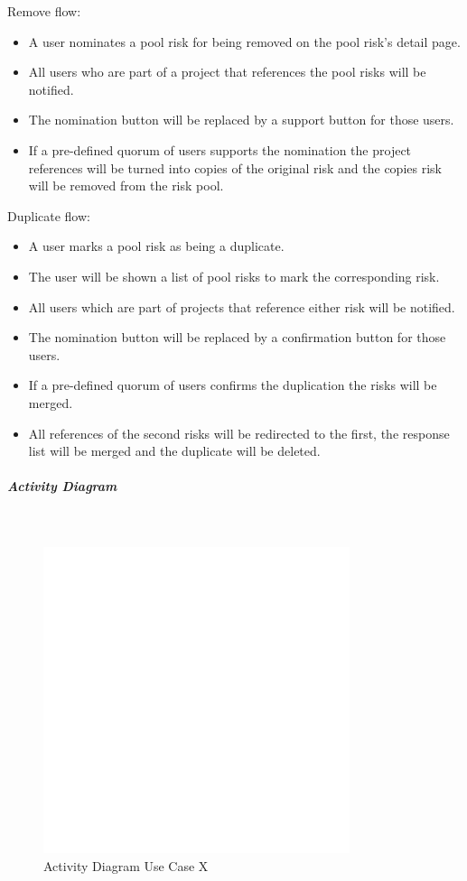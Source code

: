 Remove flow:
\begin{itemize}
	\vspace{-3mm}
	\setlength\itemsep{-1em}
	\item A user nominates a pool risk for being removed on the pool risk's detail page.
	\item All users who are part of a project that references the pool risks will be notified.
	\item The nomination button will be replaced by a support button for those users.
	\item If a pre-defined quorum of users supports the nomination the project references will be turned into copies of the original risk and the copies risk will be removed from the risk pool.
\end{itemize}

Duplicate flow:
\begin{itemize}
	\vspace{-3mm}
	\setlength\itemsep{-1em}
	\item A user marks a pool risk as being a duplicate.
	\item The user will be shown a list of pool risks to mark the corresponding risk.
	\item All users which are part of projects that reference either risk will be notified.
	\item The nomination button will be replaced by a confirmation button for those users.
	\item If a pre-defined quorum of users confirms the duplication the risks will be merged.
	\item All references of the second risks will be redirected to the first, the response list will be merged and the duplicate will be deleted.
\end{itemize}

\subparagraph{Activity Diagram}\mbox{}\\
\begin{figure}[H]
	\centering
	\includegraphics[width=0.8\textwidth]{Content/Domain/placeholder.png}
	\caption{Activity Diagram Use Case X}
	\label{fig:label55}
\end{figure}

